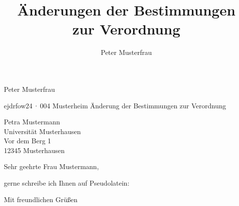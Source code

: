 \documentclass[ngerman]{etslttr}
\begin{document}
\author{Peter Musterfrau}
\title {Änderungen der Bestimmungen zur Verordnung}

   {Peter Musterfrau}
  {\\}


  {ejdrfow24\,·\,004}
    {Musterheim}
  {Änderung der Bestimmungen zur Verordnung}

\begin{letter}{%
    Petra Mustermann\\
    Universität Musterhausen\\
    Vor dem Berg 1\\
    12345 Musterhausen}
  
  \opening{Sehr geehrte Frau Mustermann,}

  gerne schreibe ich Ihnen auf Pseudolatein: \lipsum[1][3-7]

  \closing{Mit freundlichen Grüßen}
\end{letter}
\end{document}
